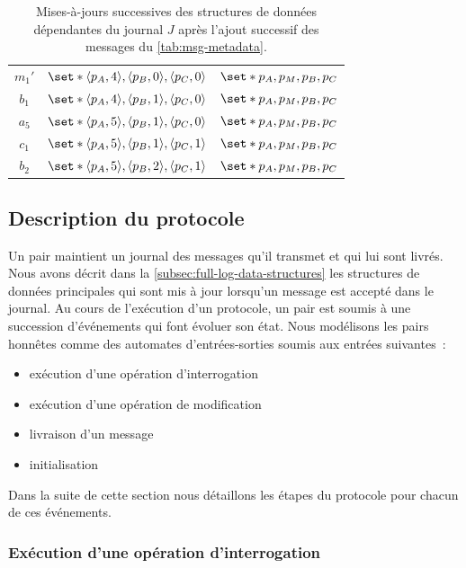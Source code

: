 \begin{table}[ht]
\begin{subtable}{\linewidth}
\begin{tabular}{ccc}
        $m_1'$ & $\set*{\tuple*{p_A, 4}, \tuple*{p_B, 0}, \tuple*{p_C, 0}}$ & $\set*{p_A,p_M,p_B,p_C}$ \\
        $b_1$ & $\set*{\tuple*{p_A, 4}, \tuple*{p_B, 1}, \tuple*{p_C, 0}}$ & $\set*{p_A,p_M,p_B,p_C}$ \\
        $a_5$ & $\set*{\tuple*{p_A, 5}, \tuple*{p_B, 1}, \tuple*{p_C, 0}}$ & $\set*{p_A,p_M,p_B,p_C}$ \\
        $c_1$ & $\set*{\tuple*{p_A, 5}, \tuple*{p_B, 1},\tuple*{p_C, 1}}$ & $\set*{p_A,p_M,p_B,p_C}$ \\
        $b_2$ & $\set*{\tuple*{p_A, 5}, \tuple*{p_B, 2}, \tuple*{p_C, 1}}$ & $\set*{p_A,p_M,p_B,p_C}$ \\
    \end{tabular}
    \end{subtable}
    \caption[Exemple de mises-à-jours de structures de données dépendantes d'un' journal]{Mises-à-jours successives des structures de données dépendantes du journal $J$ après l'ajout successif des messages du \autoref{tab:msg-metadata}.}\label{tab:data-structure-update}
\end{table}
 

\subsection{Description du protocole}\label{subsec:full-log-protocol-desc}

Un pair maintient un journal des messages qu'il transmet et qui lui sont livrés.
Nous avons décrit dans la \autoref{subsec:full-log-data-structures} les structures de données principales qui sont mis à jour lorsqu'un message est accepté dans le journal.
Au cours de l'exécution d'un protocole, un pair est soumis à une succession d'événements qui font évoluer son état.
Nous modélisons les pairs honnêtes comme des automates d'entrées-sorties soumis aux entrées suivantes~:
\begin{itemize}
    \item exécution d'une opération d'interrogation
    \item exécution d'une opération de modification
    \item livraison d'un message
    \item initialisation
\end{itemize}

Dans la suite de cette section nous détaillons les étapes du protocole pour chacun de ces événements.

\subsubsection{Exécution d'une opération d'interrogation}

